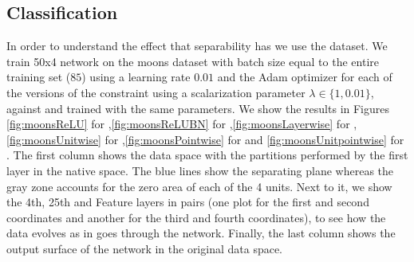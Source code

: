 \subsection{Classification}\label{subsec:classification}


In order to understand the effect that separability has we use the \moons dataset. We train 50x4 network on the moons dataset with batch size equal to the entire training set ($85$) using a learning rate $0.01$ and the Adam optimizer \cite{adam} for each of the versions of the constraint using a scalarization parameter $\lambda \in \{1, 0.01\}$, against \ReLU and \ReLUBN trained with the same parameters. We show the results in Figures \ref{fig:moonsReLU} for \ReLU,\ref{fig:moonsReLUBN} for \ReLUBN,\ref{fig:moonsLayerwise} for \SepLayer,\ref{fig:moonsUnitwise} for \SepUnit,\ref{fig:moonsPointwise} for \SepPoint and \ref{fig:moonsUnitpointwise} for \SepUnitPoint. The first column shows the data space with the partitions performed by the first layer in the native space. The blue lines show the separating plane whereas the gray zone accounts for the zero area of each of the 4 units. Next to it, we show the 4th, 25th and Feature layers in pairs (one plot for the first and second coordinates and another for the third and fourth coordinates), to see how the data evolves as in goes through the network. Finally, the last column shows the output surface of the network in the original data space. 


